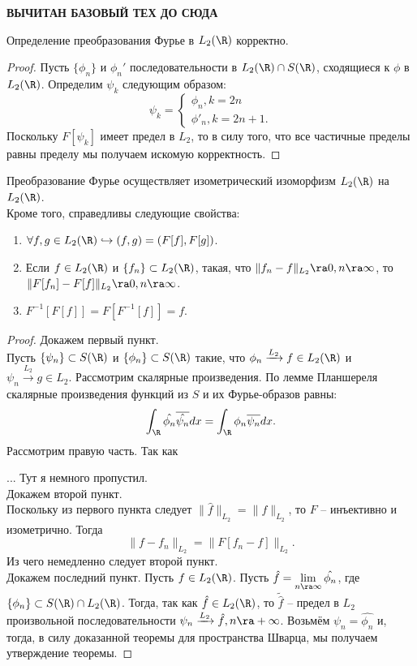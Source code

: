 \textbf{ВЫЧИТАН БАЗОВЫЙ ТЕХ ДО СЮДА}


\begin{theorem}
    Определение преобразования Фурье в $L_2(\R)$ корректно.
\end{theorem}
\begin{proof}
    Пусть $\{\phi_n\}$ и $\phi_n'$ последовательности в $L_2(\R) \cap S(\R)$, сходящиеся к $\phi$ в $L_2(\R)$.
    Определим $\psi_k$ следующим образом:
    \[
        \psi_k = \begin{cases}
                     \phi_n, k = 2n \\
                     \phi'_n, k = 2n + 1.
        \end{cases}
    \]
    Поскольку $F[\psi_k]$ имеет предел в $L_2$, то в силу того, что все частичные пределы равны пределу мы получаем искомую корректность.
\end{proof}
\begin{theorem}
    Преобразование Фурье осуществляет изометрический изоморфизм $L_2(\R)$ на $L_2(\R)$. \\
    Кроме того, справедливы следующие свойства:
    \begin{enumerate}
        \item $\forall f, g \in L_2(\R) \hookrightarrow (f, g) = (F[f], F[g])$.
        \item Если $f \in L_2(\R)$ и $\{f_n\} \subset L_2(\R)$, такая, что $\|f_n - f\|_{L_2} \ra 0, n \ra \infty$, то $\|F[f_n] - F[f]\|_{L_2} \ra 0, n \ra \infty$.
        \item $F^{-1}[F[f]] = F[F^{-1}[f]] = f$.
    \end{enumerate}
\end{theorem}
\begin{proof}
    Докажем первый пункт. \\
    Пусть $\{\psi_n\} \subset S(\R)$ и $\{\phi_n\} \subset S(\R)$ такие, что $\phi_n \xrightarrow{L_2} f \in L_2(\R)$ и $\psi_n \xrightarrow{L_2} g \in L_2$.
    Рассмотрим скалярные произведения. По лемме Планшереля скалярные произведения функций из $S$ и их Фурье-образов равны:
    \[
        \int_{\R} \hat{\phi_n} \overline{\hat{\psi_n}}dx = \int_{\R} \phi_n \overline{\psi_n} dx.
    \]
    Рассмотрим правую часть. Так как
    
    ... Тут я немного пропустил. \\
    Докажем второй пункт. \\
    Поскольку из первого пункта следует $\|\hat{f}\|_{L_2} = \|f\|_{L_2}$, то $F$ -- инъективно и изометрично.
    Тогда
    \[
        \|f - f_n\|_{L_2} = \|F[f_n - f]\|_{L_2}.
    \]
    Из чего немедленно следует второй пункт. \\
    Докажем последний пункт.
    Пусть $f \in L_2(\R)$.
    Пусть $\hat{f} = \lim\limits_{n \ra \infty} \hat{\phi_n}$, где $\{\phi_n\} \subset S(\R) \cap L_2(\R)$.
    Тогда, так как $\hat{f} \in L_2(\R)$, то $\tilde{\hat{f}}$ -- предел в $L_2$ произвольной последовательности $\psi_n \xrightarrow{L_2} \hat{f}, n \ra +\infty$.
    Возьмём $\psi_n = \hat{\phi_n}$ и, тогда, в силу доказанной теоремы для пространства Шварца, мы получаем утверждение теоремы.
\end{proof}

